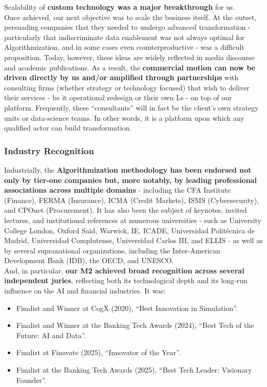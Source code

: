 \documentclass{article}
\begin{document}
Scalability of \textbf{custom technology was a major breakthrough} for us.\\

Once achieved, our next objective was to scale the business itself. At the outset, persuading companies that they needed to undergo advanced transformation - particularly that indiscriminate data enablement was not always optimal for Algorithmization, and in some cases even counterproductive - was a difficult proposition. Today, however, these ideas are widely reflected in media discourse and academic publications. As a result, the \textbf{commercial motion can now be driven directly by us and/or amplified through partnerships} with consulting firms (whether strategy or technology focused) that wish to deliver their services - be it operational redesign or their own Ls - on top of our platform. Frequently, these “consultants” will in fact be the client’s own strategy units or data-science teams. In other words, it is a platform upon which any qualified actor can build transformation.\\

\subsubsection{Industry Recognition}
\label{subsubsection: Industry Recognition}
Industrially, the \textbf{Algorithmization methodology has been endorsed not only by tier-one companies but, more notably, by leading professional associations across multiple domains} - including the CFA Institute (Finance), FERMA (Insurance), ICMA (Credit Markets), ISMS (Cybersecurity), and CPOnet (Procurement). It has also been the subject of keynotes, invited lectures, and institutional references at numerous universities - such as University College London, Oxford Saïd, Warwick, IE, ICADE, Universidad Politécnica de Madrid, Universidad Complutense, Universidad Carlos III, and ELLIS - as well as by several supranational organizations, including the Inter-American Development Bank (IDB), the OECD, and UNESCO.\\

And, in particular, \textbf{our M2 achieved broad recognition across several independent juries}, reflecting both its technological depth and its long-run influence on the AI and financial industries. It was:
\begin{itemize}
    \item Finalist and Winner at CogX (2020), “Best Innovation in Simulation”.
    \item Finalist and Winner at the Banking Tech Awards (2024), “Best Tech of the Future: AI and Data”.
    \item Finalist at Finovate (2025), “Innovator of the Year”.
    \item Finalist at the Banking Tech Awards (2025), “Best Tech Leader: Visionary Founder”.
\end{itemize}
\end{document}
